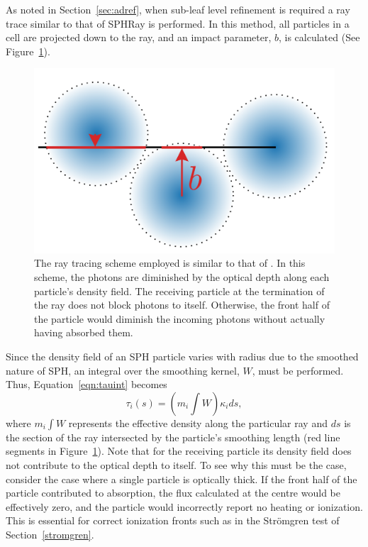 \documentclass[fleq,usenatbib]{mnras}
\newcommand{\strom}{Str\"omgren}
\begin{document}
{As noted in Section~\ref{sec:adref}, when sub-leaf level 
refinement is required a ray trace similar to that of 
SPHRay is performed. In this method, all particles in a cell are projected 
down to the ray, and an impact parameter, $b$, is calculated (See 
Figure~\ref{fig:raytrace}).
\begin{figure}
\includegraphics[width=1\linewidth]{Figures/raytrace.pdf}
\caption{The ray tracing scheme employed is similar to that of 
\protect\cite{altayEt08}. In this scheme, the photons are diminished by the 
optical depth along each particle's density field. The receiving particle at 
the termination of the ray does not block photons to itself. Otherwise, the front half 
of the particle would diminish the incoming photons without actually having 
absorbed them.} 
\label{fig:raytrace}
\end{figure}
Since the density field of an SPH particle varies with radius due to the 
smoothed nature of SPH, an integral over the smoothing kernel, $W$, must be 
performed. Thus, Equation~\ref{eqn:tauint} becomes 
\begin{equation}
\tau_i(s) = \left(m_i\int W\right) \kappa_i ds,
\end{equation}
where $m_i \int W$ represents the effective density along the particular ray 
and $ds$ is the section of the ray intersected by the particle's smoothing 
length (red line segments in Figure~\ref{fig:raytrace}). Note that for the 
receiving particle its density field does not contribute to the optical depth
to itself.  
To see why this must be the case, consider the case where a single particle is
optically thick. If the front half of the particle contributed to absorption,
the flux calculated at the centre would be effectively zero, and the particle 
would incorrectly report no heating or ionization.  This is essential for correct
ionization fronts such as in the \strom{} test of Section~\ref{stromgren}.

}
\end{document}
